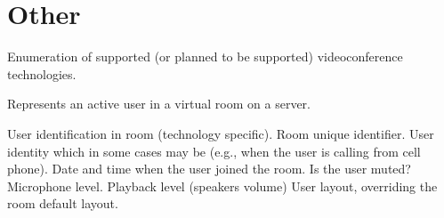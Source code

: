 \section{Other} \label{sect:common:other}

\begin{Api}

Enumeration of supported (or planned to be supported) videoconference technologies.
\begin{ApiEnumValues}
\end{ApiEnumValues}

Represents an active user in a virtual room on a server.
\begin{ApiClassAttributes}
User identification in room (technology specific).
Room unique identifier. 
User identity which in some cases may be  (e.g., when the user is calling from cell phone).
 Date and time when the user joined the room.
Is the user muted?
Microphone level.
Playback level (speakers volume)
User layout, overriding the room default layout.
\end{ApiClassAttributes}

\end{Api}

